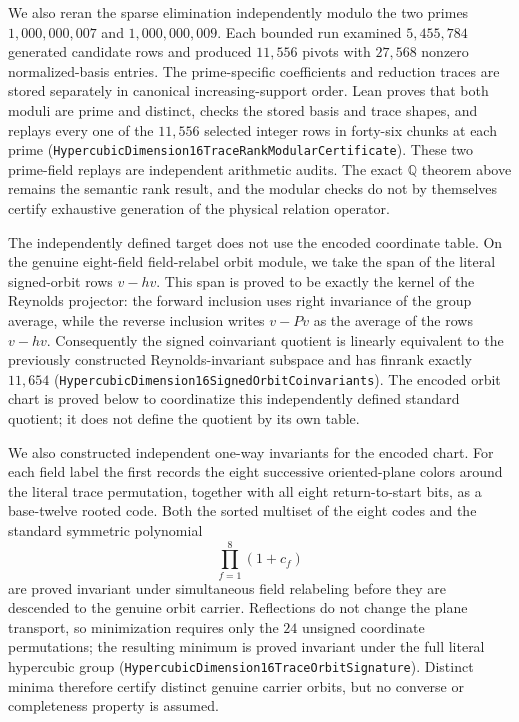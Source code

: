 \documentclass[11pt]{article}
\theoremstyle{definition}
\begin{document}
We also reran the sparse elimination independently modulo the two primes
$1{,}000{,}000{,}007$ and $1{,}000{,}000{,}009$.  Each bounded run examined
$5{,}455{,}784$ generated candidate rows and produced $11{,}556$ pivots with
$27{,}568$ nonzero normalized-basis entries.  The prime-specific coefficients
and reduction traces are stored separately in canonical increasing-support
order.  Lean proves that both moduli are prime and distinct, checks the stored
basis and trace shapes, and replays every one of the $11{,}556$ selected
integer rows in forty-six chunks at each prime
(\texttt{HypercubicDimension16TraceRankModularCertificate}).  These two
prime-field replays are independent arithmetic audits.  The exact
$\mathbb Q$ theorem above remains the semantic rank result, and the modular
checks do not by themselves certify exhaustive generation of the physical
relation operator.

The independently defined target does not use the encoded coordinate table.
On the genuine eight-field field-relabel orbit module, we
take the span of the literal signed-orbit rows $v-hv$.  This span is proved to
be exactly the kernel of the Reynolds projector: the forward inclusion uses
right invariance of the group average, while the reverse inclusion writes
$v-Pv$ as the average of the rows $v-hv$.  Consequently the signed
coinvariant quotient is linearly equivalent to the previously constructed
Reynolds-invariant subspace and has finrank exactly $11{,}654$
(\texttt{HypercubicDimension16SignedOrbitCoinvariants}).  The encoded orbit
chart is proved below to coordinatize this independently defined standard
quotient; it does not define the quotient by its own table.

We also constructed independent one-way invariants for the encoded chart.
For each field label the first records the eight successive oriented-plane
colors around the literal trace permutation, together with all eight
return-to-start bits, as a base-twelve rooted code.  Both the sorted multiset
of the eight codes and the standard symmetric polynomial
\[
  \prod_{f=1}^{8}(1+c_f)
\]
are proved invariant under simultaneous field relabeling before they are
descended to the genuine orbit carrier.  Reflections do not change the plane
transport, so minimization requires only the $24$ unsigned coordinate
permutations; the resulting minimum is proved invariant under the full
literal hypercubic group
(\texttt{HypercubicDimension16TraceOrbitSignature}).  Distinct minima
therefore certify distinct genuine carrier orbits, but no converse or
completeness property is assumed.
\end{document}
